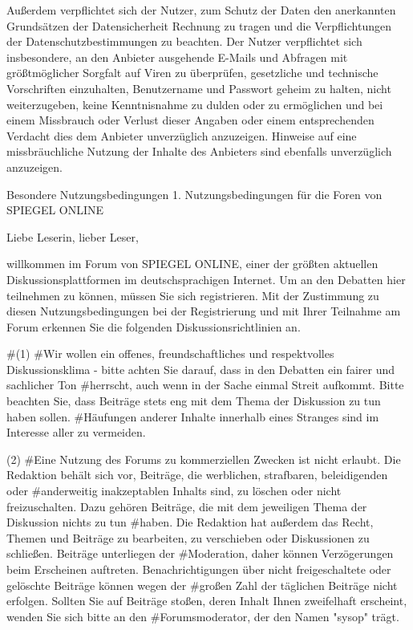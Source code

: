 Außerdem verpflichtet sich der Nutzer, zum Schutz der Daten den anerkannten Grundsätzen der Datensicherheit Rechnung zu tragen und die Verpflichtungen der Datenschutzbestimmungen zu beachten. Der Nutzer verpflichtet sich insbesondere, an den Anbieter ausgehende E-Mails und Abfragen mit größtmöglicher Sorgfalt auf Viren zu überprüfen, gesetzliche und technische Vorschriften einzuhalten, Benutzername und Passwort geheim zu halten, nicht weiterzugeben, keine Kenntnisnahme zu dulden oder zu ermöglichen und bei einem Missbrauch oder Verlust dieser Angaben oder einem entsprechenden Verdacht dies dem Anbieter unverzüglich anzuzeigen. Hinweise auf eine missbräuchliche Nutzung der Inhalte des Anbieters sind ebenfalls unverzüglich anzuzeigen.

Besondere Nutzungsbedingungen
1. Nutzungsbedingungen für die Foren von SPIEGEL ONLINE

Liebe Leserin, lieber Leser,

willkommen im Forum von SPIEGEL ONLINE, einer der größten aktuellen Diskussionsplattformen im deutschsprachigen Internet. Um an den Debatten hier teilnehmen zu können, müssen Sie sich registrieren. Mit der Zustimmung zu diesen Nutzungsbedingungen bei der Registrierung und mit Ihrer Teilnahme am Forum erkennen Sie die folgenden Diskussionsrichtlinien an.

#(1)
#Wir wollen ein offenes, freundschaftliches und respektvolles Diskussionsklima - bitte achten Sie darauf, dass in den Debatten ein fairer und sachlicher Ton #herrscht, auch wenn in der Sache einmal Streit aufkommt. Bitte beachten Sie, dass Beiträge stets eng mit dem Thema der Diskussion zu tun haben sollen. #Häufungen anderer Inhalte innerhalb eines Stranges sind im Interesse aller zu vermeiden.

(2)
#Eine Nutzung des Forums zu kommerziellen Zwecken ist nicht erlaubt. Die Redaktion behält sich vor, Beiträge, die werblichen, strafbaren, beleidigenden oder #anderweitig inakzeptablen Inhalts sind, zu löschen oder nicht freizuschalten. Dazu gehören Beiträge, die mit dem jeweiligen Thema der Diskussion nichts zu tun #haben. Die Redaktion hat außerdem das Recht, Themen und Beiträge zu bearbeiten, zu verschieben oder Diskussionen zu schließen. Beiträge unterliegen der #Moderation, daher können Verzögerungen beim Erscheinen auftreten. Benachrichtigungen über nicht freigeschaltete oder gelöschte Beiträge können wegen der #großen Zahl der täglichen Beiträge nicht erfolgen. Sollten Sie auf Beiträge stoßen, deren Inhalt Ihnen zweifelhaft erscheint, wenden Sie sich bitte an den #Forumsmoderator, der den Namen "sysop" trägt.

